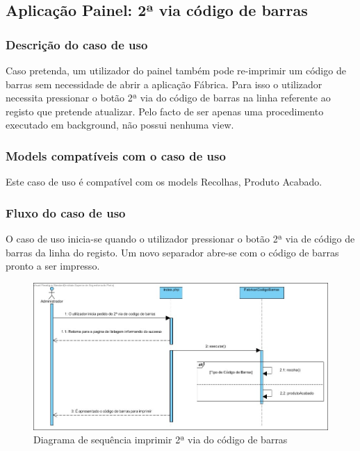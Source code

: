\subsection{Aplicação Painel: 2ª via código de barras}
\subsubsection*{Descrição do caso de uso}
Caso pretenda, um utilizador do painel também pode re-imprimir um código de barras sem necessidade de abrir a aplicação Fábrica. Para isso o utilizador necessita pressionar o botão 2ª via do código de barras na linha referente ao registo que pretende atualizar. Pelo facto de ser apenas uma procedimento executado em background, não possui nenhuma view.

\subsubsection*{Models compatíveis com o caso de uso}
Este caso de uso é compatível com os models Recolhas, Produto Acabado.

\subsubsection*{Fluxo do caso de uso}
O caso de uso inicia-se quando o utilizador pressionar o botão 2ª via de código de barras da linha do registo. Um novo separador abre-se com o código de barras pronto a ser impresso.


\begin{figure}[H] 
	\begin{center}
		\includegraphics[width=\textwidth,keepaspectratio]{figuras/Diagramas_vp/SD_Painel_6_2_via_Codigo_de_Barras.jpg}
		\caption{Diagrama de sequência imprimir 2ª via do código de barras}
		\label{fig:sd_2_via_painel} 
	\end{center}
\end{figure}